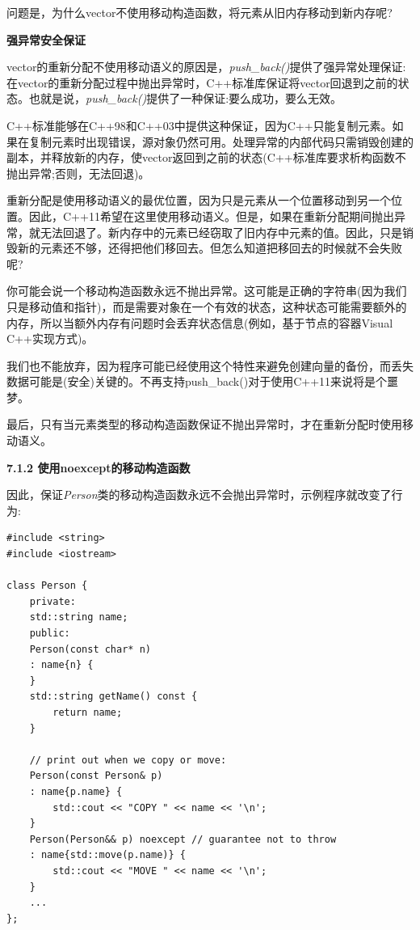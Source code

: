 问题是，为什么vector不使用移动构造函数，将元素从旧内存移动到新内存呢?\par

\hspace*{\fill} \par %
\textbf{强异常安全保证}

vector的重新分配不使用移动语义的原因是，\textit{push\_back()}提供了强异常处理保证:在vector的重新分配过程中抛出异常时，C++标准库保证将vector回退到之前的状态。也就是说，\textit{push\_back()}提供了一种保证:要么成功，要么无效。\par

C++标准能够在C++98和C++03中提供这种保证，因为C++只能复制元素。如果在复制元素时出现错误，源对象仍然可用。处理异常的内部代码只需销毁创建的副本，并释放新的内存，使vector返回到之前的状态(C++标准库要求析构函数不抛出异常;否则，无法回退)。\par

重新分配是使用移动语义的最优位置，因为只是元素从一个位置移动到另一个位置。因此，C++11希望在这里使用移动语义。但是，如果在重新分配期间抛出异常，就无法回退了。新内存中的元素已经窃取了旧内存中元素的值。因此，只是销毁新的元素还不够，还得把他们移回去。但怎么知道把移回去的时候就不会失败呢?\par

你可能会说一个移动构造函数永远不抛出异常。这可能是正确的字符串(因为我们只是移动值和指针)，而是需要对象在一个有效的状态，这种状态可能需要额外的内存，所以当额外内存有问题时会丢弃状态信息(例如，基于节点的容器Visual C++实现方式)。\par

我们也不能放弃，因为程序可能已经使用这个特性来避免创建向量的备份，而丢失数据可能是(安全)关键的。不再支持push\_back()对于使用C++11来说将是个噩梦。\par

最后，只有当元素类型的移动构造函数保证不抛出异常时，才在重新分配时使用移动语义。\par

\hspace*{\fill} \par %
\textbf{7.1.2 使用noexcept的移动构造函数}

因此，保证\textit{Person}类的移动构造函数永远不会抛出异常时，示例程序就改变了行为:\par

{\color{red}{basics/personmove.hpp}}\par

\begin{lstlisting}[caption={}]
#include <string>
#include <iostream>

class Person {
	private:
	std::string name;
	public:
	Person(const char* n)
	: name{n} {
	}
	std::string getName() const {
		return name;
	}

	// print out when we copy or move:
	Person(const Person& p)
	: name{p.name} {
		std::cout << "COPY " << name << '\n';
	}
	Person(Person&& p) noexcept // guarantee not to throw
	: name{std::move(p.name)} {
		std::cout << "MOVE " << name << '\n';
	}
	...
};
\end{lstlisting}

